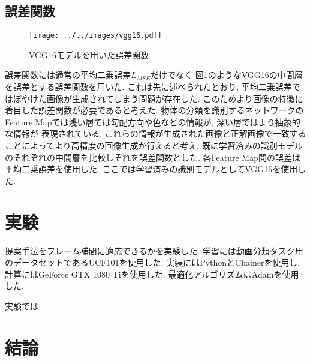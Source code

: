 \documentclass[twocolumn,a4j,uplatex]{jsarticle}
\begin{document}
\subsection{誤差関数}
\begin{figure}[htbp]
    \centering
    \texttt{[image: ../../images/vgg16.pdf]}
    \caption{VGG16モデルを用いた誤差関数}
    \label{fig:vgg16loss}
\end{figure}

誤差関数には通常の平均二乗誤差$L_{MSE}$だけでなく
図\ref{fig:vgg16loss}のようなVGG16\cite{VGG16}の中間層を誤差とする誤差関数を用いた.
これは先に述べられたとおり, 平均二乗誤差ではぼやけた画像が生成されてしまう問題が存在した.
このためより画像の特徴に着目した誤差関数が必要であると考えた.
物体の分類を識別するネットワークのFeature Mapでは浅い層では勾配方向や色などの情報が, 深い層ではより抽象的な情報が
表現されている. これらの情報が生成された画像と正解画像で一致することによってより高精度の画像生成が行えると考え,
既に学習済みの識別モデルのそれぞれの中間層を比較しそれを誤差関数とした.
各Feature Map間の誤差は平均二乗誤差を使用した.
ここでは学習済みの識別モデルとしてVGG16\cite{VGG16}を使用した.

\section{実験}
提案手法をフレーム補間に適応できるかを実験した.
学習には動画分類タスク用のデータセットであるUCF101\cite{UCF101}を使用した.
実装にはPythonとChainer\cite{chainer_learningsys2015}を使用し, 計算にはGeForce GTX 1080 Tiを使用した.
最適化アルゴリズムはAdam\cite{kingma2014adam}を使用した.

実験では
\section{結論}



\end{document}
